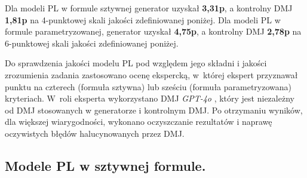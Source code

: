 Dla modeli PL w formule sztywnej generator uzyskał \textbf{3,31p}, a kontrolny DMJ \textbf{1,81p} na 4-punktowej skali jakości zdefiniowanej poniżej. Dla modeli PL w formule parametryzowanej, generator uzyskał \textbf{4,75p}, a kontrolny DMJ \textbf{2,78p} na 6-punktowej skali jakości zdefiniowanej poniżej.


Do sprawdzenia jakości modelu PL pod względem jego składni i jakości zrozumienia zadania zastosowano ocenę ekspercką, w~której ekspert przyznawał punktu na czterech (formuła sztywna) lub sześciu (formuła parametryzowana) kryteriach. W~roli eksperta wykorzystano DMJ \textit{GPT-4o} \cite{TODO}, który jest niezależny od DMJ stosowanych w generatorze i kontrolnym DMJ. Po otrzymaniu wyników, dla większej wiarygodności, wykonano oczyszczanie rezultatów i naprawę oczywistych błędów halucynowanych przez DMJ. %



\subsection{Modele PL w sztywnej formule.}

